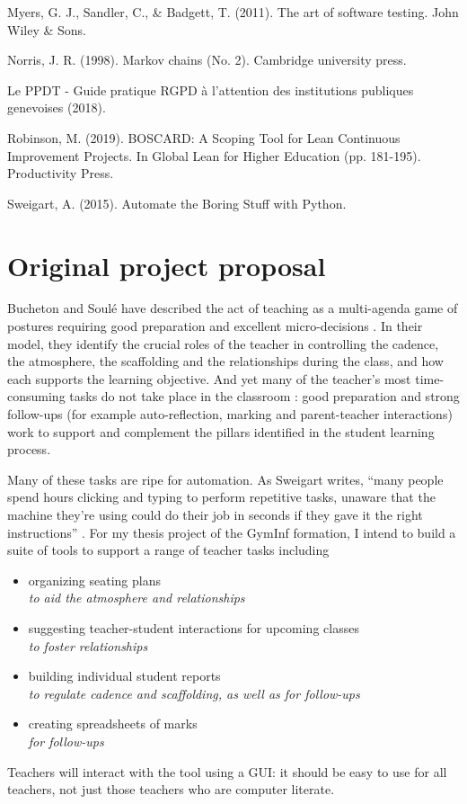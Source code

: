 \documentclass[10pt]{article}
\begin{document}
\begin{thebibliography}{Xyzz12}
 Myers, G. J., Sandler, C., \& Badgett, T. (2011). The art of software testing. John Wiley \& Sons.

 Norris, J. R. (1998). Markov chains (No. 2). Cambridge university press.

 Le PPDT - Guide pratique RGPD à l'attention des institutions publiques genevoises (2018).


 Robinson, M. (2019). BOSCARD: A Scoping Tool for Lean Continuous Improvement Projects. In Global Lean for Higher Education (pp. 181-195). Productivity Press.

 Sweigart, A. (2015). Automate the Boring Stuff with Python.
\end{thebibliography}


\appendix

\section{Original project proposal}

Bucheton and Soulé have described the act of teaching as a multi-agenda game of postures requiring good preparation and excellent micro-decisions \cite{BS09}. In their model, they identify the crucial roles of the teacher in controlling the cadence, the atmosphere, the scaffolding and the relationships during the class, and how each supports the learning objective. And yet many of the teacher's most time-consuming tasks do not take place in the classroom \cite{Bryant20}: good preparation and strong follow-ups (for example auto-reflection, marking and parent-teacher interactions) work to support and complement the pillars identified in the student learning process.

Many of these tasks are ripe for automation. As Sweigart writes, ``many people spend hours clicking and typing to perform repetitive tasks, unaware that the machine they’re using could do their job in seconds if they gave it the right instructions'' \cite{Swei15}.  For my thesis project of the GymInf formation, I intend to build a suite of tools to support a range of teacher tasks including 
\begin{itemize} 
\item organizing seating plans \\
\emph{to aid the atmosphere and relationships} 
\item suggesting teacher-student interactions for upcoming classes \\
\emph{to foster relationships}
\item building individual student reports \\
\emph{to regulate cadence and scaffolding, as well as for follow-ups}
\item creating spreadsheets of marks \\
\emph{for follow-ups}
\end{itemize}
Teachers will interact with the tool using a GUI: it should be easy to use for all teachers, not just those teachers who are computer literate.
\end{document}

